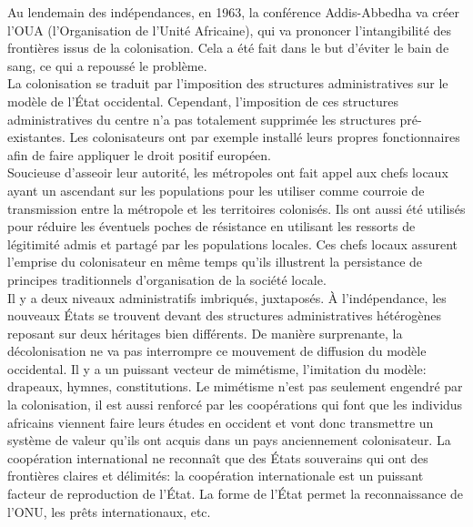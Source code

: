 \documentclass[10pt, a4paper, openany]{book}
\begin{document}
Au lendemain des indépendances, en 1963, la conférence Addis-Abbedha va créer l'OUA (l'Organisation de l'Unité Africaine), qui va prononcer l'intangibilité des frontières issus de la colonisation. Cela a été fait dans le but d'éviter le bain de sang, ce qui a repoussé le problème. \\
La colonisation se traduit par l'imposition des structures administratives sur le modèle de l'État occidental. Cependant, l'imposition de ces structures administratives du centre n'a pas totalement supprimée les structures pré-existantes. Les colonisateurs ont par exemple installé leurs propres fonctionnaires afin de faire appliquer le droit positif européen. \\
Soucieuse d'asseoir leur autorité, les métropoles ont fait appel aux chefs locaux ayant un ascendant sur les populations pour les utiliser comme courroie de transmission entre la métropole et les territoires colonisés. Ils ont aussi été utilisés pour réduire les éventuels poches de résistance en utilisant les ressorts de légitimité admis et partagé par les populations locales. Ces chefs locaux assurent l'emprise du colonisateur en même temps qu'ils illustrent la persistance de principes traditionnels d'organisation de la société locale. \\
Il y a deux niveaux administratifs imbriqués, juxtaposés. À l'indépendance, les nouveaux États se trouvent devant des structures administratives hétérogènes reposant sur deux héritages bien différents. De manière surprenante, la décolonisation ne va pas interrompre ce mouvement de diffusion du modèle occidental. Il y a un puissant vecteur de mimétisme, l'imitation du modèle: drapeaux, hymnes, constitutions. Le mimétisme n'est pas seulement engendré par la colonisation, il est aussi renforcé par les coopérations qui font que les individus africains viennent faire leurs études en occident et vont donc transmettre un système de valeur qu'ils  ont acquis dans un pays anciennement colonisateur. La coopération international ne reconnaît que des États souverains qui ont des frontières claires et délimités: la coopération internationale est un puissant facteur de reproduction de l'État. La forme de l'État permet la reconnaissance de l'ONU, les prêts internationaux, etc. 
\end{document}

